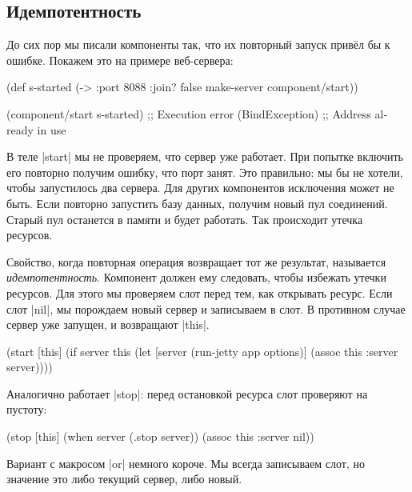 \subsection{Идемпотентность}

До сих пор мы писали компоненты так, что их повторный запуск прив\"{е}л бы к
ошибке. Покажем это на примере веб-сервера:

\begin{english}
  \begin{clojure}
(def s-started (-> {:port 8088 :join? false}
                    make-server
                    component/start))

(component/start s-started)
;; Execution error (BindException)
;; Address already in use
  \end{clojure}
\end{english}

В теле \spverb|start| мы не проверяем, что сервер уже работает. При попытке
включить его повторно получим ошибку, что порт занят. Это правильно: мы бы не
хотели, чтобы запустилось два сервера. Для других компонентов исключения может
не быть. Если повторно запустить базу данных, получим новый пул
соединений. Старый пул останется в памяти и будет работать. Так происходит
утечка ресурсов.

Свойство, когда повторная операция возвращает тот же результат, называется
\emph{идемпотентность}. Компонент должен ему следовать, чтобы избежать утечки
ресурсов. Для этого мы проверяем слот перед тем, как открывать ресурс. Если слот
\spverb|nil|, мы порождаем новый сервер и записываем в слот. В противном случае
сервер уже запущен, и возвращают \spverb|this|.

\begin{english}
  \begin{clojure}
(start [this]
  (if server
    this
    (let [server (run-jetty app options)]
      (assoc this :server server))))
  \end{clojure}
\end{english}

Аналогично работает \spverb|stop|: перед остановкой ресурса слот проверяют на
пустоту:

\begin{english}
  \begin{clojure}
(stop [this]
  (when server
    (.stop server))
  (assoc this :server nil))
  \end{clojure}
\end{english}

Вариант с макросом \spverb|or| немного короче. Мы всегда записываем слот, но
значение это либо текущий сервер, либо новый.

